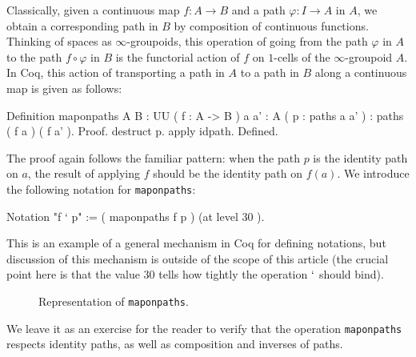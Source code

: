 Classically, given a continuous map $f:A\to B$ and a path
$\varphi:I\to A$ in $A$, we obtain a corresponding path in $B$ by
composition of continuous functions.  Thinking of spaces as
$\infty$-groupoids, this operation of going from the path $\varphi$ in
$A$ to the path $f\circ\varphi$ in $B$ is the functorial action of $f$
on $1$-cells of the $\infty$-groupoid $A$.  In Coq, this action of
transporting a path in $A$ to a path in $B$ along a continuous map is
given as follows:
\begin{center}
  \begin{coqcode}
Definition maponpaths { A B : UU } ( f : A -> B ) { a a' : A } ( p : paths a a' ) : paths ( f a ) ( f a' ).
Proof.
  destruct p. apply idpath. 
Defined.
  \end{coqcode}
\end{center}
The proof again follows the familiar pattern: when the path $p$ is the
identity path on $a$, the result of applying $f$ should be the
identity path on $f(a)$.  We introduce the following notation for
\verb|maponpaths|:
\begin{center}
  \begin{coqcode}
Notation "f ` p" := ( maponpaths f p ) (at level 30 ).
  \end{coqcode}
\end{center}
This is an example of a general mechanism in Coq for defining
notations, but discussion of this mechanism is outside of the scope of
this article (the crucial point here is that the value 30 tells how
tightly the operation $`$ should bind).
\begin{figure}[ht]
  \centering
  \caption{Representation of \texttt{maponpaths}.}
\end{figure}
We leave it as an exercise for the reader to verify that the
operation \verb|maponpaths| respects identity paths, as well as
composition and inverses of paths.

